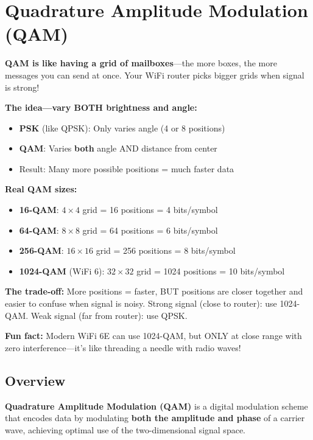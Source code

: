 \chapter{Quadrature Amplitude Modulation (QAM)}
\label{ch:qam}

\begin{nontechnical}
\textbf{QAM is like having a grid of mailboxes}---the more boxes, the more messages you can send at once. Your WiFi router picks bigger grids when signal is strong!

\textbf{The idea---vary BOTH brightness and angle:}
\begin{itemize}
\item \textbf{PSK} (like QPSK): Only varies angle (4 or 8 positions)
\item \textbf{QAM}: Varies \textbf{both} angle AND distance from center
\item Result: Many more possible positions = much faster data
\end{itemize}

\textbf{Real QAM sizes:}
\begin{itemize}
\item \textbf{16-QAM}: $4 \times 4$ grid = 16 positions = 4 bits/symbol
\item \textbf{64-QAM}: $8 \times 8$ grid = 64 positions = 6 bits/symbol
\item \textbf{256-QAM}: $16 \times 16$ grid = 256 positions = 8 bits/symbol
\item \textbf{1024-QAM} (WiFi 6): $32 \times 32$ grid = 1024 positions = 10 bits/symbol
\end{itemize}

\textbf{The trade-off:} More positions = faster, BUT positions are closer together and easier to confuse when signal is noisy. Strong signal (close to router): use 1024-QAM. Weak signal (far from router): use QPSK.

\textbf{Fun fact:} Modern WiFi 6E can use 1024-QAM, but ONLY at close range with zero interference---it's like threading a needle with radio waves!
\end{nontechnical}

\section{Overview}

\textbf{Quadrature Amplitude Modulation (QAM)} is a digital modulation scheme that encodes data by modulating \textbf{both the amplitude and phase} of a carrier wave, achieving optimal use of the two-dimensional signal space.

